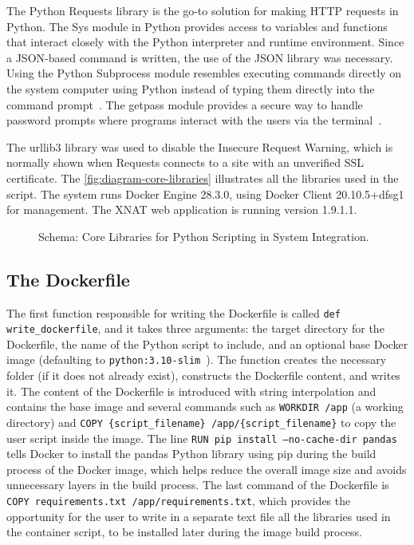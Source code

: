 The Python Requests library is the go-to solution for making \ac{HTTP} requests in Python. The Sys module in Python provides access to variables and functions that interact closely with the Python interpreter and runtime environment.
Since a JSON-based command is written, the use of the JSON library was necessary. Using the Python Subprocess module resembles executing commands directly on the system computer using Python instead of typing them directly into the command prompt~\cite{subprocess1}.
The getpass module provides a secure way to handle password prompts where programs interact with the users via the terminal~\cite{getpass1}. 

The urllib3 library was used to disable the Insecure Request Warning, which is normally shown when Requests connects to a site with an unverified SSL certificate. The \autoref{fig:diagram-core-libraries} illustrates all the libraries used in the script.
The system runs Docker Engine 28.3.0, using Docker Client 20.10.5+dfsg1 for management. The XNAT web application is running version 1.9.1.1.

\begin{figure}[H]
  \centering
  \def\svgwidth{0.4\linewidth}
  
  \caption{Schema: Core Libraries for Python Scripting in System Integration.}
  \label{fig:diagram-core-libraries}
\end{figure}
 
  \subsection{The Dockerfile}
 
The first function responsible for writing the Dockerfile is called \texttt{def write\_dockerfile}, and it takes three arguments: the target directory for the Dockerfile, the name of the Python script to include, and an optional base Docker image (defaulting to \texttt{python:3.10-slim}~\cite{Dockerbaseimage}). The function creates the necessary folder (if it does not already exist), constructs the Dockerfile content, and writes it. The content of the Dockerfile is introduced with string interpolation and contains the base image and several commands such as \texttt{WORKDIR /app} (a working directory) and \texttt{COPY \{script\_filename\} /app/\{script\_filename\}} to copy the user script inside the image. The line \texttt{RUN pip install --no-cache-dir pandas} tells Docker to install the pandas Python library using pip during the build process of the Docker image, which helps reduce the overall image size and avoids unnecessary layers in the build process. The last command of the Dockerfile is \texttt{COPY requirements.txt /app/requirements.txt}, which provides the opportunity for the user to write in a separate text file all the libraries used in the container script, to be installed later during the image build process.



